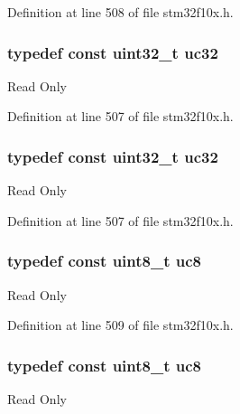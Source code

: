 Definition at line 508 of file stm32f10x.\+h.

\subsubsection[{\texorpdfstring{uc32}{uc32}}]{\setlength{\rightskip}{0pt plus 5cm}typedef const {\bf uint32\+\_\+t} {\bf uc32}}\hypertarget{group___exported__types_ga5b628e6a05856ff67e535fa391a57683}{}\label{group___exported__types_ga5b628e6a05856ff67e535fa391a57683}
Read Only 

Definition at line 507 of file stm32f10x.\+h.

\subsubsection[{\texorpdfstring{uc32}{uc32}}]{\setlength{\rightskip}{0pt plus 5cm}typedef const {\bf uint32\+\_\+t} {\bf uc32}}\hypertarget{group___exported__types_ga5b628e6a05856ff67e535fa391a57683}{}\label{group___exported__types_ga5b628e6a05856ff67e535fa391a57683}
Read Only 

Definition at line 507 of file stm32f10x.\+h.

\subsubsection[{\texorpdfstring{uc8}{uc8}}]{\setlength{\rightskip}{0pt plus 5cm}typedef const {\bf uint8\+\_\+t} {\bf uc8}}\hypertarget{group___exported__types_gac74022c74a461f810e0d4fdc9bfea480}{}\label{group___exported__types_gac74022c74a461f810e0d4fdc9bfea480}
Read Only 

Definition at line 509 of file stm32f10x.\+h.

\subsubsection[{\texorpdfstring{uc8}{uc8}}]{\setlength{\rightskip}{0pt plus 5cm}typedef const {\bf uint8\+\_\+t} {\bf uc8}}\hypertarget{group___exported__types_gac74022c74a461f810e0d4fdc9bfea480}{}\label{group___exported__types_gac74022c74a461f810e0d4fdc9bfea480}
Read Only 

